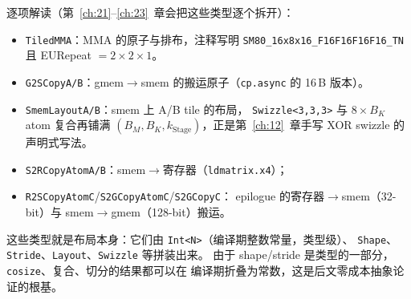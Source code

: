 逐项解读（第~\ref{ch:21}--\ref{ch:23}~章会把这些类型逐个拆开）：

\begin{itemize}
  \item \texttt{TiledMMA}：MMA 的原子与排布，注释写明
        \texttt{SM80\_\allowbreak{}16x8x16\_\allowbreak{}F16\allowbreak{}F16\allowbreak{}F16\allowbreak{}F16\_\allowbreak{}TN} 且 EURepeat $=2\times2\times1$。
  \item \texttt{G2SCopyA/B}：gmem$\to$smem 的搬运原子（\texttt{cp.async}
        的 16\,B 版本）。
  \item \texttt{Smem\allowbreak{}Layout\allowbreak{}A/\allowbreak{}B}：smem 上 A/B tile 的布局，
        \texttt{Swizzle\allowbreak{}<3,\allowbreak{}3,\allowbreak{}3>} 与 $8\times B_K$ atom 复合再铺满
        $(B_M,B_K,k_{\mathrm{Stage}})$，正是第~\ref{ch:12}~章手写 XOR swizzle 的
        声明式写法。
  \item \texttt{S2\allowbreak{}RCopy\allowbreak{}Atom\allowbreak{}A/\allowbreak{}B}：smem$\to$寄存器（\texttt{ldmatrix.x4}）；
  \item \texttt{R2\allowbreak{}SCopy\allowbreak{}Atom\allowbreak{}C}/\texttt{S2\allowbreak{}GCopy\allowbreak{}Atom\allowbreak{}C}/\texttt{S2GCopyC}：
        epilogue 的寄存器$\to$smem（32-bit）与 smem$\to$gmem（128-bit）搬运。
\end{itemize}

这些类型就是布局本身：它们由 \texttt{Int<N>}（编译期整数常量，类型级）、
\texttt{Shape}、\texttt{Stride}、\texttt{Layout}、\texttt{Swizzle} 等拼装出来。
由于 shape/stride 是类型的一部分，\texttt{cosize}、复合、切分的结果都可以在
编译期折叠为常数，这是后文零成本抽象论证的根基。


